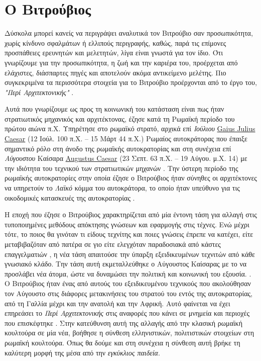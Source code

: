 
\section{Ο Βιτρούβιος}

Δύσκολα μπορεί κανείς να περιγράψει αναλυτικά τον Βιτρούβιο
σαν προσωπικότητα, χωρίς κίνδυνο σφαλμάτων ή ελλιπούς περιγραφής, καθώς, παρά 
τις επίμονες προσπάθειες ερευνητών και μελετητών, λίγα είναι γνωστά για τον 
ίδιο. Ότι γνωρίζουμε για την προσωπικότητα, η ζωή και την καριέρα του, 
προέρχεται από ελάχιστες, διάσπαρτες πηγές και αποτελούν ακόμα αντικείμενο 
μελέτης. Πιο συγκεκριμένα τα περισσότερα στοιχεία για το Βιτρούβιο προέρχονται 
από το έργο του, \emph{"Περί Αρχιτεκτονικής"} 
\cite{vitruvius-lefas,baldwin-1990,masterson_status_2004}.

Αυτά που γνωρίζουμε ως προς τη κοινωνική του κατάσταση είναι πως ήταν στρατιωτικός μηχανικός και αρχιτέκτονας, έζησε κατά τη Ρωμαϊκή περίοδο του πρώτου αιώνα π.Χ. Υπηρέτησε στο ρωμαϊκό  στρατό, αρχικά επί \emph{Ιούλιου} \sidenote%
    {\href{https://en.wikipedia.org/wiki/Julius_Caesar}{Gaius
    Julius Caesar} (12 Ιούλ. 100 π.Χ. – 15 Μάρτ 44 π.Χ.) Ρωμαίος
    αυτοκράτορας που έπαιξε σημαντικό ρόλο στη άνοδο της ρωμαϊκής
    αυτοκρατορίας}
και στη συνέχεια επί \emph{Αύγουστου} Καίσαρα \sidenote%
    {\href{https://en.wikipedia.org/wiki/Augustus}{Augustus Caesar}
    (23 Σεπτ. 63 π.Χ. – 19 Αύγου. μ.Χ. 14)} 
με την ιδιότητα του τεχνικού των στρατιωτικών μηχανών 
\cite{vitruvius-lefas,enwiki:vitruvius}. Την ύστερη περίοδο της ρωμαϊκής 
αυτοκρατορίες στην οποία έζησε ο Βιτρούβιος ήταν σύνηθες οι αρχιτέκτονες να 
υπηρετούν το \emph{Λαϊκό} κόμμα του αυτοκράτορα, το οποίο ήταν υπεύθυνο για τις 
οικοδομικές κατασκευές της αυτοκρατορίας \cite[σ. 13]{vitruvius-lefas}.

Η εποχή που έζησε ο Βιτρούβιος χαρακτηρίζεται από μία έντονη τάση για αλλαγή 
στις τυποποιημένες μεθόδους απόκτησης γνώσεων και εφαρμογής στις τέχνες. Ενώ 
μέχρι τότε, το ποιος θα γινόταν τι είδους τεχνίτης και ποιες γνώσεις έπρεπε να 
κατέχει, είτε μεταβιβαζόταν από πατέρα σε γιο είτε ελεγχόταν παραδοσιακά από 
κάστες επαγγελματιών , η νέα τάση 
    απαιτούσε την ύπαρξη εξειδικευμένων τεχνιτών από κάθε γνωσιακό κλάδο. Την 
    τάση αυτή εκμεταλλεύθηκε ο Αύγουστος Καίσαρας με το να προσλάβει νέα άτομα, 
    ώστε να δυναμώσει την πολιτική και κοινωνική του εξουσία. 
    \cite{masterson_status_2004,brown-vitruvius}. Ο Βιτρούβιος ήταν ένας από 
    αυτούς του εξειδικευμένου τεχνικούς που ακολούθησαν τον Αύγουστο στις 
    διάφορες μετακινήσεις του στρατού του εντός της αυτοκρατορίας, από τη 
    Γαλλία μέχρι και την ανατολή και την Αφρική. Αυτό φαίνεται να έχει 
    επηρεάσει το \emph{Περί Αρχιτεκτονικής} στις αναφορές που κάνει σε μνημεία 
    και περιοχές που επισκέφτηκε \cite[σ. 13]{vitruvius-lefas}. Στην κατεύθυνση 
    αυτή της αλλαγής από την κλασική ρωμαϊκή κουλτούρα σε μία νέα, βοήθησε η 
    σύνθεση ελληνιστικών, πολιτιστικών στοιχείων στη ρωμαϊκή κουλτούρα. Όπως θα 
    δούμε και στη συνέχεια η σύνθεση αυτή βρήκε τη καλύτερη μορφή της μέσα από 
    την \emph{εγκύκλιος παιδεία}.